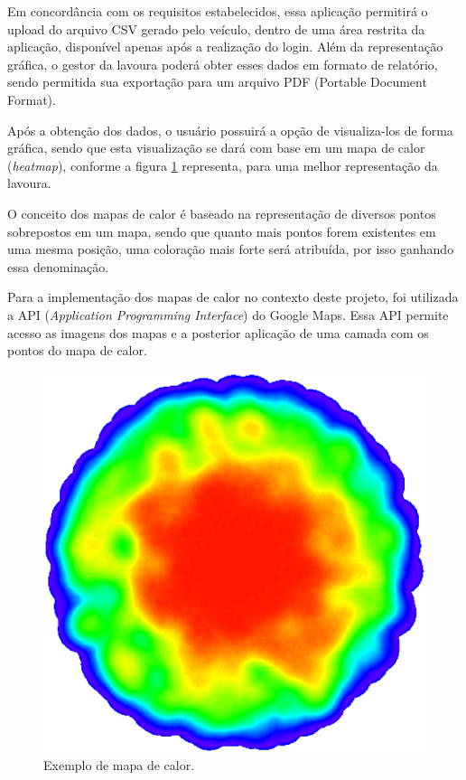   Em concordância com os requisitos estabelecidos, essa aplicação
  permitirá o upload do arquivo CSV gerado pelo veículo, dentro de
  uma área restrita da aplicação, disponível apenas após a realização
  do login.
  Além da representação gráfica, o gestor da lavoura poderá obter
  esses dados em formato de relatório, sendo permitida sua
  exportação para um arquivo PDF (Portable Document Format).

  Após a obtenção dos dados, o usuário possuirá a opção de visualiza-los de forma gráfica, sendo que esta visualização se dará
  com base em um mapa de calor (\textit{heatmap}), conforme a figura \ref{fig:heatmap} representa, para uma melhor representação da lavoura.

  O conceito dos mapas de calor é baseado na representação de diversos pontos sobrepostos em um mapa, sendo que quanto mais pontos
  forem existentes em uma mesma posição, uma coloração mais forte será atribuída, por isso ganhando essa denominação.

  Para a implementação dos mapas de calor no contexto deste projeto, foi utilizada a API (\textit{Application Programming Interface})
  do Google Maps. Essa API permite acesso as imagens dos mapas e a posterior aplicação de uma camada com os pontos do mapa de calor.

  \begin{figure}[!htbp]
  \begin{center}
  \includegraphics[width=.5\textwidth]{figuras/heatmap.eps}
  \caption{\label{fig:heatmap}Exemplo de mapa de calor.}
  \end{center}
  \end{figure}
